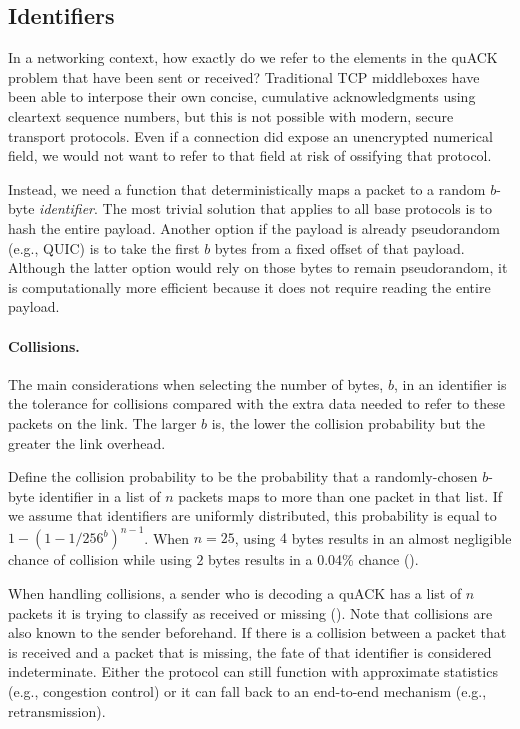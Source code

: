 \subsection{Identifiers}
\label{sec:quack:problem:identifiers}

In a networking context, how exactly do we refer to the elements
in the quACK problem that have been sent or received?
Traditional TCP middleboxes have been able to interpose their
own concise, cumulative acknowledgments using cleartext sequence numbers, but
this is not possible with modern, secure transport protocols. Even if a
connection did expose an unencrypted numerical field, we would not want to
refer to that field at risk of ossifying that protocol.

Instead, we need a function that deterministically maps
a packet to a random $b$-byte \emph{identifier}. The most trivial solution
that applies to all base protocols is
to hash the entire payload. Another option if the payload is already
pseudorandom (e.g., QUIC) is to take the first $b$ bytes from a fixed
offset of that payload. Although the latter option would rely on those bytes
to remain pseudorandom, it is computationally more efficient because it
does not require reading the entire payload.

\paragraph{Collisions.}
The main considerations when selecting the number of bytes, $b$, in an
identifier is the tolerance for collisions compared with the extra data
needed to refer to these packets on the link. The larger $b$ is, the lower
the collision probability but the greater the link overhead.

Define the collision probability to be the probability that a randomly-chosen
$b$-byte identifier in a list of $n$ packets maps to more than one packet in
that list.
If we assume that identifiers are uniformly distributed,
this probability is equal to $1-(1 - 1/256^{b})^{n-1}$.
When $n=25$, using $4$ bytes results in an almost negligible chance of
collision while using $2$ bytes results in a 0.04\% chance
().


When handling collisions, a sender who is decoding a quACK has a list of $n$
packets it is trying to classify as received or missing
(). Note that collisions are also known to the
sender beforehand. If there is a collision between a packet that is received
and a packet that is missing, the fate of that identifier is considered
indeterminate. Either the protocol can still function with approximate
statistics (e.g., congestion control) or it can fall back to an end-to-end
mechanism (e.g., retransmission).

